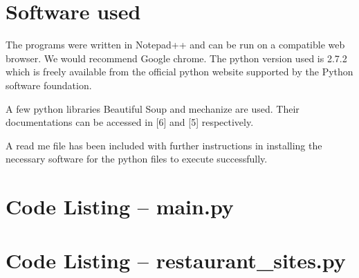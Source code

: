 
\appendix
\chapter{Software used}

The programs were written in Notepad++ and can be run on a compatible web browser. We would recommend Google chrome. The python version used is 2.7.2 which is freely available from the official python website supported by the Python software foundation.

A few python libraries Beautiful Soup and mechanize are used. Their documentations can be accessed in [6] and [5] respectively.

A read me file has been included with further instructions in installing the necessary software for the python files to execute successfully.

\chapter{Code Listing -- main.py}


\chapter{Code Listing -- restaurant\_sites.py}

